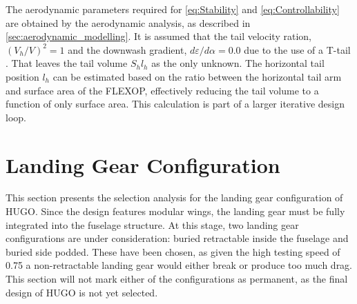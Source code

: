 The aerodynamic parameters required for \autoref{eq:Stability} and \autoref{eq:Controllability} are obtained by the aerodynamic analysis, as described in \autoref{sec:aerodynamic_modelling}. It is assumed that the tail velocity ration, $({V_h}/{V})^2=1$ and the downwash gradient, ${d\varepsilon}/{d\alpha}=0.0$ due to the use of a T-tail \cite{torenbeek2013synthesis}. That leaves the tail volume $S_h l_h$ as the only unknown. The horizontal tail position $l_h$ can be estimated based on the ratio between the horizontal tail arm and surface area of the FLEXOP, effectively reducing the tail volume to a function of only surface area. This calculation is part of a larger iterative design loop.



\section{Landing Gear Configuration}
\label{sec:Landing_gear_config}
This section presents the selection analysis for the landing gear configuration of HUGO. Since the design features modular wings, the landing gear must be fully integrated into the fuselage structure. At this stage, two landing gear configurations are under consideration: buried retractable inside the fuselage and buried side podded. These have been chosen, as given the high testing speed of 0.75 a non-retractable landing gear would either break or produce too much drag. This section will not mark either of the configurations as permanent, as the final design of HUGO is not yet selected.



